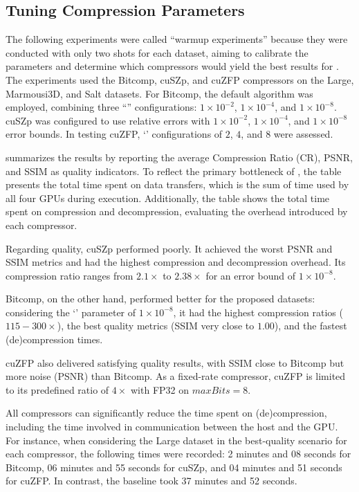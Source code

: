 \documentclass[Ingles,Final]{ic-tese-v3}
\begin{document}
\subsection{Tuning Compression Parameters}
\label{sec:warmup}

The following experiments were called ``warmup experiments'' because they were conducted with only two shots for each dataset, aiming to calibrate the parameters and determine which compressors would yield the best results for \awave. The experiments used the Bitcomp, cuSZp, and cuZFP compressors on the Large, Marmousi3D, and Salt datasets. For Bitcomp, the default algorithm was employed, combining three ``'' configurations: \( 1 \times 10^{-2} \), \( 1 \times 10^{-4} \), and \( 1 \times 10^{-8} \). cuSZp was configured to use relative errors with \( 1 \times 10^{-2} \), \( 1 \times 10^{-4} \), and \( 1 \times 10^{-8} \) error bounds. In testing cuZFP, `' configurations of $2$, $4$, and $8$ were assessed.

 summarizes the results by reporting the average Compression Ratio (CR), PSNR, and SSIM as quality indicators. To reflect the primary bottleneck of \awave, the table presents the total time spent on data transfers, which is the sum of time used by all four GPUs during execution. Additionally, the table shows the total time spent on compression and decompression, evaluating the overhead introduced by each compressor.

Regarding quality, cuSZp performed poorly. It achieved the worst PSNR and SSIM metrics and had the highest compression and decompression overhead. Its compression ratio ranges from $2.1\times$ to $2.38\times$ for an error bound of \( 1 \times 10^{-8} \).

Bitcomp, on the other hand, performed better for the proposed datasets: considering the `' parameter of \( 1 \times 10^{-8} \), it had the highest compression ratios ($115 - 300\times$), the best quality metrics (SSIM very close to $1.00$), and the fastest (de)compression times. 

cuZFP also delivered satisfying quality results, with SSIM close to Bitcomp but more noise (PSNR) than Bitcomp. As a fixed-rate compressor, cuZFP is limited to its predefined ratio of $4\times$ with FP32 on $maxBits=8$.

All compressors can significantly reduce the time spent on (de)compression, including the time involved in communication between the host and the GPU. For instance, when considering the Large dataset in the best-quality scenario for each compressor, the following times were recorded: 2 minutes and 08 seconds for Bitcomp, 06 minutes and 55 seconds for cuSZp, and 04 minutes and 51 seconds for cuZFP. In contrast, the baseline took 37 minutes and 52 seconds. 
\end{document}
